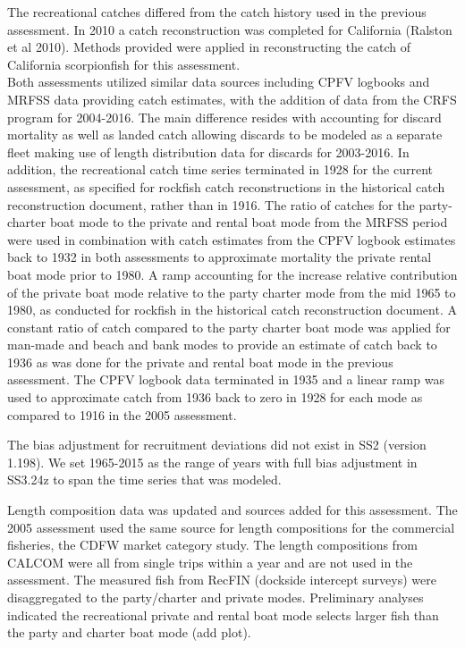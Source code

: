\documentclass[12pt,]{article}
\begin{document}
The recreational catches differed from the catch history used in the
previous assessment. In 2010 a catch reconstruction was completed for
California (Ralston et al 2010). Methods provided were applied in
reconstructing the catch of California scorpionfish for this
assessment.\\
Both assessments utilized similar data sources including CPFV logbooks
and MRFSS data providing catch estimates, with the addition of data from
the CRFS program for 2004-2016. The main difference resides with
accounting for discard mortality as well as landed catch allowing
discards to be modeled as a separate fleet making use of length
distribution data for discards for 2003-2016. In addition, the
recreational catch time series terminated in 1928 for the current
assessment, as specified for rockfish catch reconstructions in the
historical catch reconstruction document, rather than in 1916. The ratio
of catches for the party-charter boat mode to the private and rental
boat mode from the MRFSS period were used in combination with catch
estimates from the CPFV logbook estimates back to 1932 in both
assessments to approximate mortality the private rental boat mode prior
to 1980. A ramp accounting for the increase relative contribution of the
private boat mode relative to the party charter mode from the mid 1965
to 1980, as conducted for rockfish in the historical catch
reconstruction document. A constant ratio of catch compared to the party
charter boat mode was applied for man-made and beach and bank modes to
provide an estimate of catch back to 1936 as was done for the private
and rental boat mode in the previous assessment. The CPFV logbook data
terminated in 1935 and a linear ramp was used to approximate catch from
1936 back to zero in 1928 for each mode as compared to 1916 in the 2005
assessment.

The bias adjustment for recruitment deviations did not exist in SS2
(version 1.198). We set 1965-2015 as the range of years with full bias
adjustment in SS3.24z to span the time series that was modeled.

Length composition data was updated and sources added for this
assessment. The 2005 assessment used the same source for length
compositions for the commercial fisheries, the CDFW market category
study. The length compositions from CALCOM were all from single trips
within a year and are not used in the assessment. The measured fish from
RecFIN (dockside intercept surveys) were disaggregated to the
party/charter and private modes. Preliminary analyses indicated the
recreational private and rental boat mode selects larger fish than the
party and charter boat mode (add plot).
\end{document}

